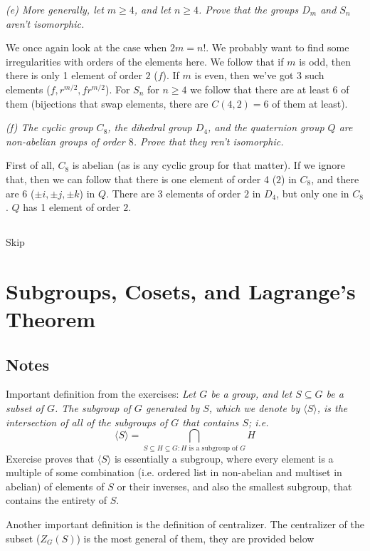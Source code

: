 \documentclass[11pt,oneside,titlepage]{book}
\newcommand{\eangle}[1]{\langle #1 \rangle}
\begin{document}
\textit{(e) More generally, let $m \geq 4$, and let $n \geq 4$. Prove
that the groups $D_m$ and $S_n$ aren't isomorphic.}

We once again look at the case when $2m = n!$. We probably want to
find some irregularities with orders of the elements here.  We follow
that if $m$ is odd, then there is only 1 element of order $2$ ($f$).
If $m$ is even, then we've got 3 such elements ($f, r^{m/2},
fr^{m/2}$).  For $S_n$ for $n \geq 4$ we follow that there are at
least 6 of them (bijections that swap elements, there are $C(4, 2) =
6$ of them at least).

\textit{(f) The cyclic group $C_8$, the dihedral group $D_4$, and the
quaternion group $Q$ are non-abelian groups of order $8$. Prove that
they ren't isomorphic.}

First of all, $C_8$ is abelian (as is any cyclic group for that
matter). If we ignore that, then we can follow that there is one
element of order 4 ($2$) in $C_8$, and there are 6 ($\pm i, \pm j, \pm
k$) in $Q$. There are 3 elements of order $2$ in $D_4$, but only one
in $C_8$. $Q$ has 1 element of order $2$.

\subsection{}

Skip

\section{Subgroups, Cosets, and Lagrange's Theorem}

\subsection*{Notes}

Important definition from the exercises: \textit{Let $G$ be a group,
and let $S \subseteq G$ be a subset of $G$. The subgroup of $G$
generated by $S$, which we denote by $\eangle{S}$, is the intersection
of all of the subgroups of $G$ that contains $S$; i.e.
  $$\eangle{S} = \bigcap_{S \subseteq H \subseteq G: H\text{ is a subgroup of }G} H$$}
Exercise proves that $\eangle{S}$ is essentially a subgroup, where
every element is a multiple of some combination (i.e. ordered list in
non-abelian and multiset in abelian) of elements of $S$ or their
inverses, and also the smallest subgroup, that contains the entirety
of $S$.

Another important definition is the definition of centralizer.  The
centralizer of the subset ($Z_G(S)$) is the most general of them, they
are provided below
\end{document}
